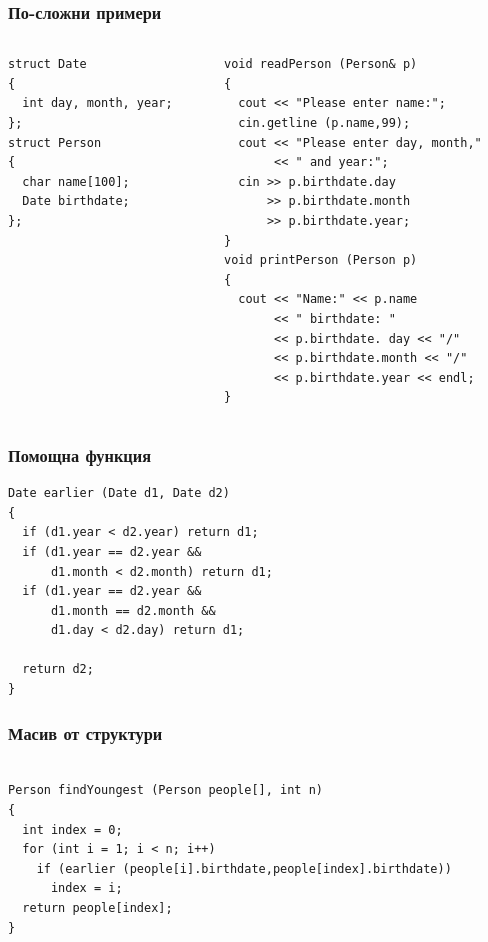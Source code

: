 \documentclass{beamer}
\begin{document}
\begin{frame}[fragile]
\frametitle{По-сложни примери} 

\begin{columns}[t]
  \begin{column}{0.4\textwidth}

\begin{lstlisting}
struct Date
{
  int day, month, year;
};
struct Person
{
  char name[100];
  Date birthdate;
};
\end{lstlisting} 

  \end{column}
  \begin{column}{0.6\textwidth}
\pause
{}
\begin{lstlisting}
void readPerson (Person& p)
{
  cout << "Please enter name:";
  cin.getline (p.name,99);
  cout << "Please enter day, month,"
       << " and year:";
  cin >> p.birthdate.day 
      >> p.birthdate.month 
      >> p.birthdate.year;
}
void printPerson (Person p)
{
  cout << "Name:" << p.name 
       << " birthdate: " 
       << p.birthdate. day << "/" 
       << p.birthdate.month << "/"
       << p.birthdate.year << endl;
}

\end{lstlisting}  
  \end{column}
\end{columns}

 

\end{frame}


\begin{frame}[fragile]
\frametitle{Помощна функция} 

\begin{lstlisting}
Date earlier (Date d1, Date d2)
{
  if (d1.year < d2.year) return d1;
  if (d1.year == d2.year && 
      d1.month < d2.month) return d1;
  if (d1.year == d2.year && 
      d1.month == d2.month && 
      d1.day < d2.day) return d1;

  return d2;
}

\end{lstlisting}  

\end{frame}


\begin{frame}[fragile]
\frametitle{Масив от структури} 

\begin{lstlisting}

Person findYoungest (Person people[], int n)
{
  int index = 0;
  for (int i = 1; i < n; i++)
    if (earlier (people[i].birthdate,people[index].birthdate))
      index = i;
  return people[index];
}


\end{lstlisting}  

\end{frame}
\end{document}
